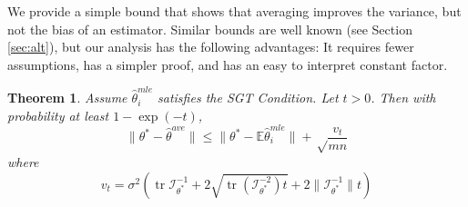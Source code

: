 \documentclass[twoside]{article}
\newtheorem{theorem}{Theorem}
\DeclareMathOperator*{\tr}{tr}
\newcommand{\E}{\mathbb{E}}
\newcommand{\w}{\theta}
\newcommand{\wave}{\hat\w^{ave}}
\newcommand{\wmle}{\hat\w^{mle}}
\newcommand{\wstar}{{\w^{*}}}
\newcommand{\I}{\mathcal I}
\newcommand{\ltwo}[1]{{\lVert {#1} \rVert}}
\begin{document}
We provide a simple bound that shows that averaging improves the variance,
but not the bias of an estimator.
Similar bounds are well known (see Section \ref{sec:alt}),
but our analysis has the following advantages:
It requires fewer assumptions, has a simpler proof, and has an easy to interpret constant factor.

\begin{theorem}
\label{thm:wave}
Assume $\wmle_i$ satisfies the SGT Condition.
Let $t>0$.
Then with probability at least $1-\exp(-t)$,
\begin{equation}
\ltwo{\wstar-\wave} \le \ltwo{\wstar-\E\wmle_i} + \sqrt\frac{v_t}{mn}
\end{equation}
where
\begin{equation}
v_t =
\sigma^2
\left(
\tr{\I^{-1}_{\wstar}}
+ 2\sqrt{\tr \left({\I^{-2}_{\wstar}}\right)t}
+ 2\ltwo{\I^{-1}_{\wstar}}t
\right)
\label{eq:vt}
\end{equation}
\end{theorem}
\end{document}
